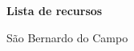 \documentclass[12pt]{article}
\providecommand{\cidade}{São Bernardo do Campo}
\begin{document}
  \thispagestyle{empty}
  \begin{center}
    \uppercase\expandafter{\alunos}

    \vfill

    \textbf{\MakeUppercase{\titulo}}

    \vfill

    \textbf{Lista de recursos}

    \vfill

    \begin{flushright}
      \begin{minipage}{6cm}
        \normalsize
        \descricao
      \end{minipage}
    \end{flushright}

    \vfill

    \cidade\\[0.5em]
    \ano

  \end{center}%
  \clearpage

  \small

  \small

  \tabelasRecursos{\section*}

  \resumoRecursos{\section*}
\end{document}
